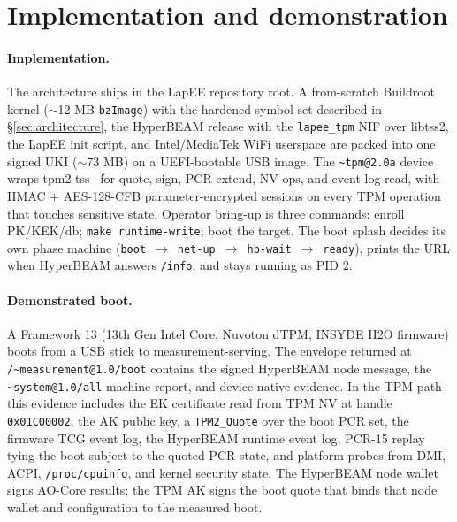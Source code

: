 \documentclass[10pt,a4paper]{article}
\begin{document}
\section{Implementation and demonstration}
\label{sec:implementation}
\vspace{-0.3em}

\paragraph{Implementation.} The architecture ships in the LapEE
repository root. A
from-scratch Buildroot kernel ($\sim$12 MB \texttt{bzImage}) with the
hardened symbol set described in \S\ref{sec:architecture}, the
HyperBEAM release with the \texttt{lapee\_tpm} NIF over libtss2, the
LapEE init script, and Intel/MediaTek WiFi userspace are packed into
one signed UKI ($\sim$73 MB) on a UEFI-bootable USB image. The
\texttt{\~{}tpm@2.0a} device wraps tpm2-tss~\cite{tpm2-tss} for
quote, sign, PCR-extend, NV ops, and event-log-read, with HMAC +
AES-128-CFB parameter-encrypted sessions on every TPM operation that
touches sensitive state. Operator bring-up is three commands: enroll
PK/KEK/db; \texttt{make runtime-write}; boot the
target. The boot splash decides its own phase machine
(\texttt{boot}~$\rightarrow$~\texttt{net-up}~$\rightarrow$~\texttt{hb-wait}~$\rightarrow$~\texttt{ready}),
prints the URL when HyperBEAM answers \texttt{/info}, and stays
running as PID 2.

\paragraph{Demonstrated boot.} A Framework 13 (13th Gen Intel Core,
Nuvoton dTPM, INSYDE H2O firmware) boots from a USB stick to
measurement-serving. The envelope returned at
\texttt{/\~{}measurement@1.0/boot} contains the signed HyperBEAM node
message, the \texttt{\~{}system@1.0/all} machine report, and
device-native evidence. In the TPM path this evidence includes the EK
certificate read from TPM NV at handle \texttt{0x01C00002}, the AK
public key, a \texttt{TPM2\_Quote} over the boot PCR set, the firmware
TCG event log, the HyperBEAM runtime event log, PCR-15 replay tying the
boot subject to the quoted PCR state, and platform probes from DMI,
ACPI, \texttt{/proc/cpuinfo}, and kernel security state. The HyperBEAM
node wallet signs AO-Core results; the TPM AK signs the boot quote that
binds that node wallet and configuration to the measured boot.
\end{document}
